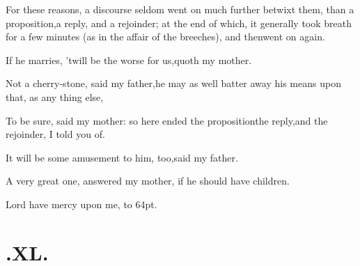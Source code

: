 \documentclass{article}
\begin{document}
For these reasons, a discourse seldom went on much further
betwixt them, than a proposition,\tsk a reply, and a rejoinder;
at the end of which, it gene\-rally took breath for a few minutes (as
in the affair of the breeches), and then\break went on again.

If he marries, ’twill be the worse for us,\tsk quoth my
mother.

Not a cherry-stone, said my father,\tsk he may as well batter
away his means upon that, as any thing else,

\tsh To be sure, said my mother: so here ended the
proposition\tsk the reply,\break\tsk and the rejoinder, I told you
of.

It will be some amusement to him, too,\tsh said my
father.

A very great one, answered my mo\-ther, if he should have
children.\tsh

\tsh Lord have mercy upon me,\tsk\break
{}
\stick{\astfill}
\stick{\astfill}
\stick{\astfill}
\hbox to 64pt{\astfill.}

\vfill{}\eject
\null\smallskip
\section{.\enspace XL.}
\end{document}
